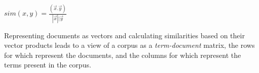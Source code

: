 \begin{center}
    $sim(x, y) = \frac{(\vec{x} . \vec{y})}{|\vec{x}| | \vec{y}}$
\end{center}

Representing documents as vectors and calculating similarities based on their vector products leads to a view of a corpus as a \emph{term-document} matrix, the rows for which represent the documents, and the columns for which represent the terms present in the corpus.
